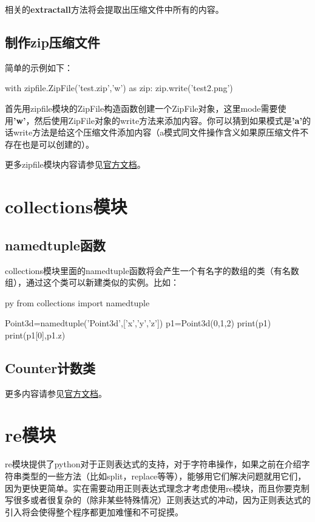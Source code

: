 \documentclass[12pt,oneside]{book}
\begin{document}
\begin{common-format}
相关的\textbf{extractall}方法将会提取出压缩文件中所有的内容。

\section{制作zip压缩文件}
简单的示例如下：
\begin{tcbpython}[]
with zipfile.ZipFile('test.zip','w') as zip:
    zip.write('test2.png')
\end{tcbpython}
首先用zipfile模块的ZipFile构造函数创建一个ZipFile对象，这里mode需要使用\textbf{'w'}，然后使用ZipFile对象的write方法来添加内容。你可以猜到如果模式是\textbf{'a'}的话write方法是给这个压缩文件添加内容（a模式同文件操作含义如果原压缩文件不存在也是可以创建的）。



\begin{large}
更多zipfile模块内容请参见\href{https://docs.python.org/3.4/library/zipfile.html}{官方文档}。
\end{large}


\chapter{collections模块}
\section{namedtuple函数}
collections模块里面的namedtuple函数将会产生一个有名字的数组的类（有名数组），通过这个类可以新建类似的实例。比如：
\begin{xverbatim}[129]{py}
from collections import namedtuple

Point3d=namedtuple('Point3d',['x','y','z'])
p1=Point3d(0,1,2)
print(p1)
print(p1[0],p1.z)
\end{xverbatim}

\section{Counter计数类}



\begin{large}
更多内容请参见\href{https://docs.python.org/3/library/collections.html}{官方文档}。
\end{large}



\chapter{re模块}
\label{sec:re模块}
re模块提供了python对于正则表达式的支持，对于字符串操作，如果之前在介绍字符串类型的一些方法（比如split，replace等等），能够用它们解决问题就用它们，因为更快更简单。实在需要动用正则表达式理念才考虑使用re模块，而且你要克制写很多或者很复杂的（除非某些特殊情况）正则表达式的冲动，因为正则表达式的引入将会使得整个程序都更加难懂和不可捉摸。


\end{common-format}
\end{document}
